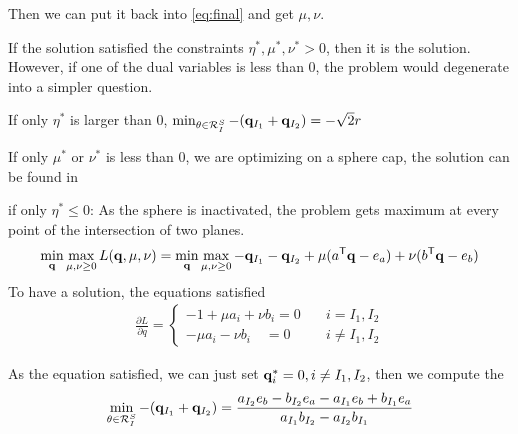 Then we can put it back into \ref{eq:final} and get $\mu, \nu$.

If the solution satisfied the constraints $\eta^{*}, \mu^{*}, \nu^{*} > 0$, then it is the solution.
However, if one of the dual variables is less than 0, the problem would degenerate into a simpler question. 

If only $\eta^{*}$ is larger than 0, 
 $\min_{\theta \in \mathcal{R}^{S}_{I}}{- ( \mathbf q_{I_1} +\mathbf q_{I_2} )} = -\sqrt{2}r$

If only $\mu^{*}$ or $\nu^{*}$ is less than 0, we are optimizing on a sphere cap, the solution can be found in \cite[Appendix B]{NEURIPS2021_7b5b23f4}

if only $\eta^{*} \leq 0$:
As the sphere is inactivated, the problem gets maximum at every point of the intersection of two planes.
\begin{equation}
\min_{\mathbf q} \max_{\mu,\nu \geq 0} L(\mathbf q,\mu,\nu) =\min_{\mathbf q}\max_{\mu,\nu\geq0} - {\mathbf q_{I_1} - \mathbf q_{I_2} +\mu( a^{\mathsf T}\mathbf q - e_a ) + \nu( b^{\mathsf T}\mathbf q - e_b )}
\end{equation}
To have a solution, the equations satisfied
 \begin{equation}
\begin{split} 
\frac{\partial L}{\partial q} = \left\{
\begin{aligned}
-1+\mu a_i + \nu b_i =0 \quad& i = I_1, I_2\\
-\mu a_i -\nu b_i \quad =0& i \neq I_1, I_2
\end{aligned}
\right.
 \end{split}
\end{equation}

As the equation satisfied, we can just set $\mathbf q_i^{*} = 0, i \neq I_1,I_2$, then we compute the  
 \begin{equation}
 \min_{\theta \in \mathcal{R}^{S}_{I}}{- ( \mathbf q_{I_1} +\mathbf q_{I_2} )} = \frac{a_{I_2}e_b - b_{I_2}e_a -a_{I_1}e_b +b_{I_1}e_a}{a_{I_1}b_{I_2}-a_{I_2}b_{I_1}}
\end{equation}